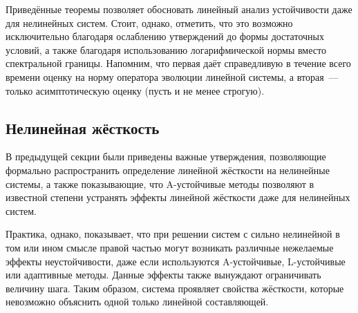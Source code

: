 Приведённые теоремы позволяет обосновать линейный анализ устойчивости даже для нелинейных систем.
Стоит, однако, отметить, что это возможно исключительно благодаря ослаблению утверждений до формы достаточных условий,
а также благодаря использованию логарифмической нормы вместо спектральной границы.
Напомним, что первая даёт справедливую в течение всего времени оценку на норму оператора эволюции линейной системы,
а вторая~--- только асимптотическую оценку (пусть и не менее строгую).


\subsection{Нелинейная жёсткость}
\label{subsec:nonlinear_stiffness}

В предыдущей секции были приведены важные утверждения,
позволяющие формально распространить определение линейной жёсткости на нелинейные системы,
а также показывающие, что A-устойчивые методы позволяют в известной степени устранять эффекты линейной жёсткости даже для нелинейных систем.

Практика, однако, показывает, что при решении систем с сильно нелинейной в том или ином смысле правой частью
могут возникать различные нежелаемые эффекты неустойчивости,
даже если используются A-устойчивые, L-устойчивые или адаптивные методы.
Данные эффекты также вынуждают ограничивать величину шага.
Таким образом, система проявляет свойства жёсткости, которые невозможно объяснить одной только линейной составляющей.

